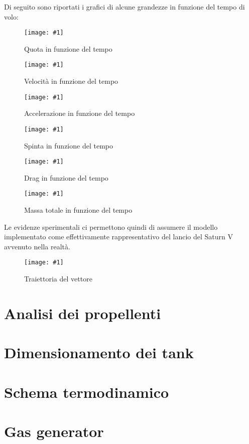 \documentclass[11pt,a4paper,twocolumn]{article}
\newcommand{\figura}[3]{
\begin{figure}[H]
	\centering
	\texttt{[image: \#1]}
	\caption{#2}
	\label{fig:#3}
\end{figure}
}
\begin{document}
Di seguito sono riportati i grafici di alcune grandezze in funzione del tempo di volo:

\figura{01_quota_t}{Quota in funzione del tempo}{quota_t}

\figura{02_velocita_t}{Velocità in funzione del tempo}{velocita_t}

\figura{03_accelerazione_t}{Accelerazione in funzione del tempo}{accelerazione_t}

\figura{04_spinta_t}{Spinta in funzione del tempo}{spinta_t}

\figura{05_drag_t}{Drag in funzione del tempo}{drag_t}

\figura{06_massa_t}{Massa totale in funzione del tempo}{massa_t}



Le evidenze sperimentali ci permettono quindi di assumere il modello implementato come effettivamente rappresentativo del lancio del Saturn V avvenuto nella realtà.


\figura{07_traiettoria}{Traiettoria del vettore}{traiettoria}




\section{Analisi dei propellenti}

\label{sec:analisi propellenti}




\section{Dimensionamento dei tank}

\label{sec:dimensionamento tank}




\section{Schema termodinamico}

\label{sec:schema termodinamico}




\section{Gas generator}
\end{document}
